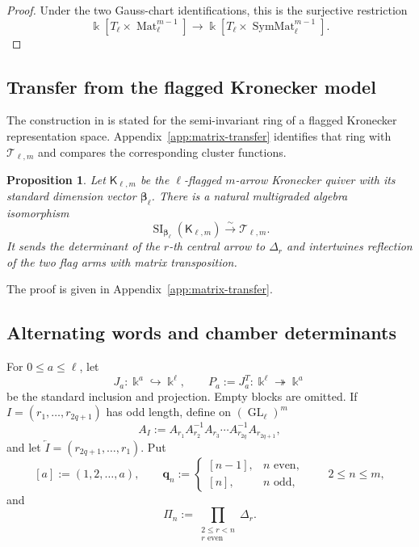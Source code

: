 \documentclass[11pt]{amsart}
\newtheorem{proposition}[theorem]{Proposition}
\theoremstyle{definition}
\theoremstyle{remark}
\newcommand{\kk}{\Bbbk}
\newcommand{\GL}{\operatorname{GL}}
\newcommand{\SymMat}{\operatorname{SymMat}}
\newcommand{\cT}{\mathcal T}
\newcommand{\Mat}{\operatorname{Mat}}
\newcommand{\SI}{\operatorname{SI}}
\begin{document}
\begin{proof}
Under the two Gauss-chart identifications, this is the surjective
restriction
\[ \kk[T_\ell\times\Mat_\ell^{m-1}] \longrightarrow\kk[T_\ell\times\SymMat_\ell^{m-1}]. \]
\end{proof}


\subsection{Transfer from the flagged Kronecker model}
\label{subsec:matrix-transfer}

The construction in \cite{FeiKroneckerII} is stated for the semi-invariant
ring of a flagged Kronecker representation space.  Appendix~\ref{app:matrix-transfer}
identifies that ring with $\cT_{\ell,m}$ and compares the corresponding
cluster functions.

\begin{proposition}\label{prop:matrix-transfer}
Let $\mathsf K_{\ell,m}$ be the $\ell$-flagged $m$-arrow Kronecker quiver
with its standard dimension vector $\boldsymbol\beta_\ell$.  There is a
natural multigraded algebra isomorphism
\[ \SI_{\boldsymbol\beta_\ell}(\mathsf K_{\ell,m}) \xrightarrow{\sim}\cT_{\ell,m}. \]
It sends the determinant of the $r$-th central arrow to $\Delta_r$ and
intertwines reflection of the two flag arms with matrix transposition.
\end{proposition}

The proof is given in Appendix~\ref{app:matrix-transfer}.

\subsection{Alternating words and chamber determinants}
\label{subsec:matrix-chambers}

For $0\le a\le\ell$, let
\[ J_a:\kk^a\hookrightarrow\kk^\ell, \qquad P_a:=J_a^T:\kk^\ell\twoheadrightarrow\kk^a \]
be the standard inclusion and projection.  Empty blocks are omitted.  If
$I=(r_1,\ldots,r_{2q+1})$ has odd length, define on $(\GL_\ell)^m$
\begin{equation}
 A_I:=A_{r_1}A_{r_2}^{-1}A_{r_3}\cdots
       A_{r_{2q}}^{-1}A_{r_{2q+1}},
 \label{eq:alternating-word}
\end{equation}
and let $\overleftarrow I=(r_{2q+1},\ldots,r_1)$.  Put
\[
 [a]:=(1,2,\ldots,a),
 \qquad
 \mathbf q_n:=
 \begin{cases}
  [n-1],&n\text{ even},\\
  [n],&n\text{ odd},
 \end{cases}
 \qquad 2\le n\le m,
\]
and
\[ \Pi_n:=\prod_{\substack{2\le r<n\\r\text{ even}}}\Delta_r. \]
\end{document}
